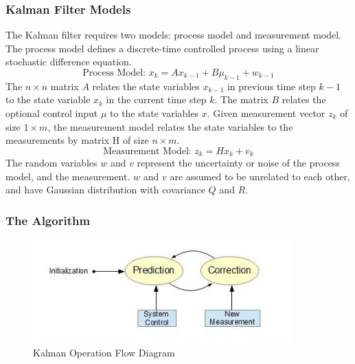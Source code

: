 \subsubsection{Kalman Filter Models}

The Kalman filter requires two models: process model and measurement
model. The process model defines a discrete-time controlled process
using a linear stochastic difference equation.
\begin{equation}
\text{Process Model: }x_k = Ax_{k-1}+B\mu_{k-1}+w_{k-1}
\end{equation}
\noindent The $n\times n$ matrix $A$ relates the state variables
$x_{k-1}$ in previous time step $k-1$ to the state variable $x_{k}$ in
the current time step $k$. The matrix $B$ relates the optional control
input $\mu$ to the state variables $x$. Given measurement vector $z_k$
of size $1 \times m$, the measurement model relates the state
variables to the measurements by matrix H of size $n \times m$. 
\begin{equation}
\text{Measurement Model: }z_k = Hx_k+v_k
\end{equation}
The random variables $w$ and $v$ represent the uncertainty or noise of
the process model, and the measurement. $w$ and $v$ are assumed to be
unrelated to each other, and have Gaussian distribution with covariance
$Q$ and $R$.

\subsubsection{The Algorithm}
\begin{figure}[h]
\centering
\includegraphics[width=10cm, keepaspectratio=true]{./Figures/KalmanOperation.jpg}
\caption{Kalman Operation Flow Diagram}
\label{figch2:1}
\end{figure}


